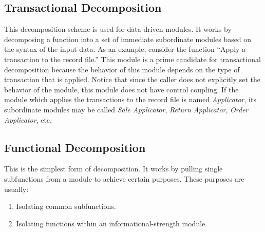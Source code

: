 \documentclass{designdoc}
\begin{document}
\subsection{Transactional Decomposition}
This decomposition scheme is used for data-driven modules. It works by
decomposing a function into a set of immediate subordinate modules based on
the syntax of the input data. As an example, consider the function ``Apply
a transaction to the record file.'' This module is a prime candidate for
transactional decomposition because the behavior of this module depends on the
type of transaction that is applied. Notice that since the caller does not
explicitly set the behavior of the module, this module does not have control
coupling. If the module which applies the transactions to the record file is
named {\it Applicator}, its subordinate modules may be called
{\it Sale Applicator}, {\it Return Applicator}, {\it Order Applicator}, etc.

\subsection{Functional Decomposition}
This is the simplest form of decomposition. It works by pulling single
subfunctions from a module to achieve certain purposes. These purposes are
usually:
\begin{enumerate}
\item Isolating common subfunctions.
\item Isolating functions within an informational-strength module.
\end{enumerate}
\end{document}
